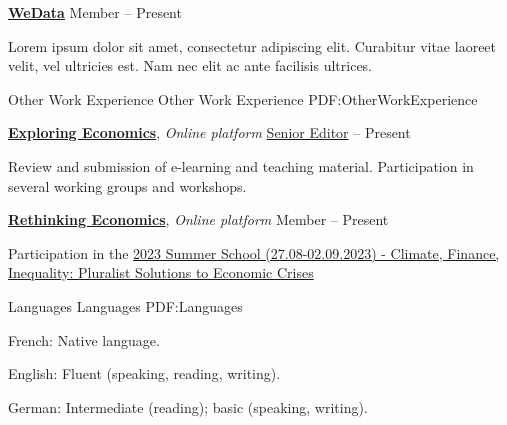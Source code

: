\documentclass[letterpaper,MMMyyyy,nonstopmode]{simpleresumecv}
\begin{document}
\begin{Body}
\begin{Detail}
\end{Detail}

\Entry
\href{https://wedata.ch/}
{\textbf{WeData}}
\Gap
\BulletItem
Member
\hfill
{} --
Present
\begin{Detail}
\SubBulletItem
Lorem ipsum dolor sit amet, consectetur adipiscing elit.
\SubBulletItem
Curabitur vitae laoreet velit, vel ultricies est. Nam nec elit ac ante facilisis ultrices.

\end{Detail}


\Section
{Other Work\newline
Experience}
{Other Work Experience}
{PDF:OtherWorkExperience}

\Entry
\href{https://www.exploring-economics.org/en/}
{\textbf{Exploring Economics}},
\textit{Online platform}
\BulletItem
\href{https://www.exploring-economics.org/fr/accounts/profile/1fb2f553-14fb-4227-b1e8-a14f2f2a1b6c/}
{Senior Editor}
\hfill
{} --
Present
\begin{Detail}
\SubBulletItem
Review and submission of e-learning and teaching material.  
\SubBulletItem
Participation in several working groups and workshops.  
\end{Detail}

\Entry
\href{https://www.rethinkeconomics.org/}
{\textbf{Rethinking Economics}},
\textit{Online platform}
\BulletItem
Member
\hfill
{} --
Present
\begin{Detail}
\SubBulletItem
Participation in the \href{https://www.swissrethinkeconomics.org/re-groups/plurale-okonomik-zurich/summer-school-2023/}{2023 Summer School (27.08-02.09.2023) - Climate, Finance, Inequality: Pluralist Solutions to Economic Crises}
\end{Detail}


\Section
{Languages}
{Languages}
{PDF:Languages}

\BulletItem
French: Native language.

\Gap
\BulletItem
English: Fluent (speaking, reading, writing).

\Gap
\BulletItem
German: Intermediate (reading); basic (speaking, writing).




\end{Body}
\end{document}
